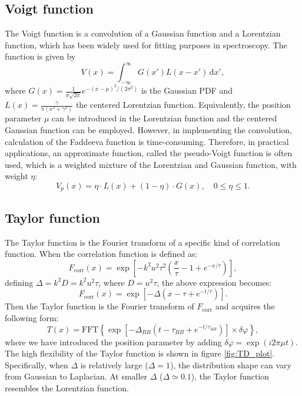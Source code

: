 \subsection*{Voigt function}

The Voigt function is a convolution of a Gaussian function and a Lorentzian function, which has been widely used for fitting purposes in spectroscopy. The function is given by
\begin{equation}
V(x)= \int_{-\infty}^{\infty} G(x')L(x-x')\,\mathrm{d}x',
\end{equation}
\noindent where $G(x) = \frac{1}{\sigma\sqrt{2\pi}}e^{-(x-\mu)^2/(2\sigma^2)}$ is the Gaussian PDF and $L(x) = \frac{\gamma}{\pi(x^2+\gamma^2)}$ the centered Lorentzian function. Equivalently, the position parameter $\mu$ can be introduced in the Lorentzian function and the centered Gaussian function can be employed. However, in implementing the convolution, calculation of the Faddeeva function is time-consuming. Therefore, in practical applications, an approximate function, called the pseudo-Voigt function is often used, which is a weighted mixture of the Lorentzian and Gaussian function, with weight $\eta$:%
\begin{equation}
V_{p}(x) = \eta \cdot L(x) + (1-\eta) \cdot G(x),\quad 0\leq\eta\leq1.
\end{equation}


\subsection*{Taylor function}

The Taylor function is the Fourier transform of a specific kind of correlation function. When the correlation function is defined as:%
\begin{equation}
  F_\mathrm{corr}(x) = \exp\left[-k^2u^2\tau^2\left(\frac{x}{\tau}-1+e^{-x/\tau}\right)\right],
\end{equation}
\noindent defining $\Delta = k^2D = k^2u^2\tau$, where $D = u^2\tau$, the above expression becomes:%
\begin{equation}
  F_\mathrm{corr}(x) = \exp\left[-\Delta(x-\tau+e^{-t/\tau})\right].
\end{equation}
\noindent Then the Taylor function is the Fourier transform of $F_\mathrm{corr}$ and acquires the following form:%
\begin{equation}
  T(x) = \mathrm{FFT}\left\{\exp\left[-\Delta_{BB}(t-\tau_{BB}+e^{-t/\tau_{BB}})\right]\times\delta\varphi\right\},
\end{equation}
\noindent where we have introduced the position parameter by adding $\delta\varphi = \exp(i2\pi\mu t)$. The high flexibility of the Taylor function is shown in figure \ref{fig:TD_plot}. Specifically, when $\Delta$ is relatively large ($\Delta = 1$), the distribution shape can vary from Gaussian to Laplacian. At smaller $\Delta$ ($\Delta \simeq 0.1$), the Taylor function resembles the Lorentzian function.

